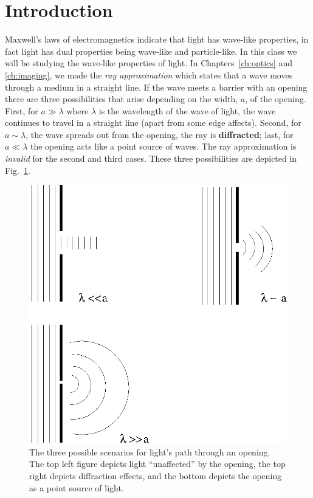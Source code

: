 \section{Introduction}
   
Maxwell's laws of electromagnetics indicate that light 
has wave-like properties,
in fact light has dual properties being wave-like and particle-like.  
In this class we will be studying the wave-like properties of light.  In 
Chapters~\ref{ch:optics} and \ref{ch:imaging}, 
we made the {\it ray approximation} which states that
a wave moves through a medium in a straight line.  If the wave
meets a barrier with an opening there are three possibilities that arise
depending on the width, $a$, of the opening.  First, for $a \gg \lambda$ 
where $\lambda $ is the wavelength of the wave of light,
the wave continues to travel in a
straight line (apart from some edge affects).  Second, for $a \sim \lambda$, 
the wave spreads out from the opening, the ray is 
{\bf diffracted}; last, for $a \ll \lambda$ the opening acts like a point 
source of waves.  The ray approximation is {\it invalid} for the second and 
third cases.
These three possibilities are depicted in Fig.~\ref{fig:diff:opening}.

\begin{figure}[htb]
\centering 
\epsfxsize=8cm \includegraphics[scale=0.6]{10_diffraction/opening.eps}
\caption{The three possible scenarios for light's path  through an opening.
The top left figure depicts light ``unaffected'' by the opening, the
top right depicts diffraction effects, and the bottom depicts the opening 
as a point source of light.}
\label{fig:diff:opening}
\end{figure}

